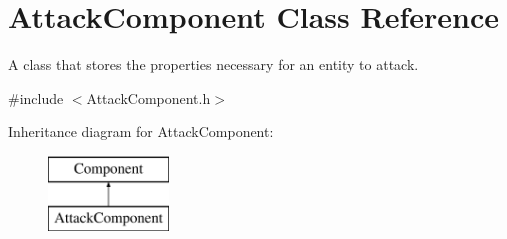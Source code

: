 \hypertarget{class_attack_component}{}\section{Attack\+Component Class Reference}
\label{class_attack_component}


A class that stores the properties necessary for an entity to attack.  




{\ttfamily \#include $<$Attack\+Component.\+h$>$}

Inheritance diagram for Attack\+Component\+:\begin{figure}[H]
\begin{center}
\leavevmode
\includegraphics[height=2.000000cm]{class_attack_component}
\end{center}
\end{figure}
